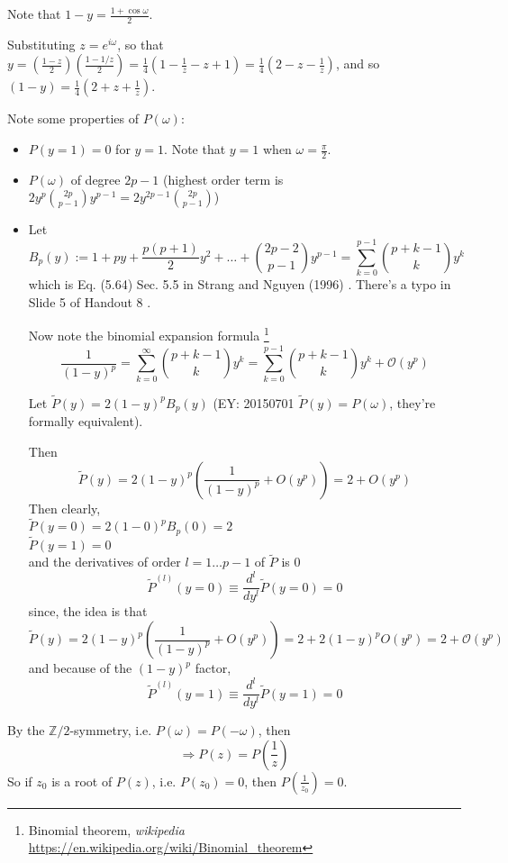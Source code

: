\documentclass[twoside]{amsart}
\theoremstyle{plain}
\theoremstyle{definition}
\theoremstyle{remark}
\numberwithin{equation}{section}
\begin{document}
Note that $1-y = \frac{1 + \cos{\omega} }{2}$.

Substituting $z = e^{i \omega}$, so that $y = \left( \frac{1-z}{2} \right) \left( \frac{1 - 1/z}{2} \right) = \frac{1}{4} ( 1 - \frac{1}{z} - z + 1 ) = \frac{1}{4} (2-z-\frac{1}{z})$, and so $(1-y) = \frac{1}{4} (2 + z+\frac{1}{z})$.  

Note some properties of $P(\omega)$:

\begin{itemize}
\item $P(y=1)=0$ for $y=1$.  Note that $y=1$ when $\omega = \frac{\pi}{2}$.  
\item $P(\omega)$ of degree $2p-1$ (highest order term is $2y^p \binom{2p}{p-1} y^{p-1} = 2y^{2p-1} \binom{2p}{p-1}$)
\item Let 
\begin{equation}\label{Eq:B_p(y)}
B_p(y) := 1 + py + \frac{ p (p+1)}{2} y^2 + \dots + \binom{ 2p-2}{p-1} y^{p-1} = \sum_{k=0}^{p-1} \binom{ p+k-1}{k} y^k
\end{equation}
which is Eq. (5.64) Sec. 5.5 in Strang and Nguyen (1996) \cite{GStrangTNguyen1996}.  There's a typo in Slide 5 of Handout 8 \cite{GStrangKAmaratunga2003}.  

Now note the binomial expansion formula \footnote{Binomial theorem, \emph{wikipedia} \url{https://en.wikipedia.org/wiki/Binomial_theorem}}
\[
\frac{1}{(1-y)^p} = \sum_{k=0}^{\infty} \binom{ p + k -1 }{k} y^k = \sum_{k=0}^{p-1} \binom{p+k-1}{k} y^k + \mathcal{O}(y^p)
\]

Let $\widetilde{P}(y) = 2(1-y)^p B_p(y)$ (EY: 20150701 $\widetilde{P}(y) = P(\omega)$, they're formally equivalent).  

Then 
\[
\widetilde{P}(y) = 2(1-y)^p \left( \frac{1}{ (1-y)^p } + O(y^p)  \right) = 2 + O(y^p)
\]
Then clearly, \\
$\widetilde{P}(y=0) = 2(1-0)^p B_p(0) = 2$ \\
$\widetilde{P}(y=1)=0$  \\
and the derivatives of order $l=1\dots p-1$ of $\widetilde{P}$ is $0$
\[
\widetilde{P}^{(l)}(y=0) \equiv \frac{d^l}{dy^l} \widetilde{P}(y=0) = 0 
\]
since, the idea is that 
\[
\widetilde{P}(y) = 2(1-y)^p \left( \frac{1}{(1-y)^p} + O(y^p)\right) = 2 + 2(1-y)^p O(y^p) = 2 + \mathcal{O}(y^p)
\]
and because of the $(1-y)^p$ factor, 
\[
\widetilde{P}^{(l)}(y=1) \equiv \frac{d^l}{dy^l}\widetilde{P}(y=1) = 0
\]
\end{itemize}


By the $\mathbb{Z}/2$-symmetry, i.e. $P(\omega) = P(-\omega)$, then
\[
\Longrightarrow P(z) = P\left( \frac{1}{z} \right)
\]
So if $z_0$ is a root of $P(z)$, i.e. $P(z_0) =0$, then $P\left( \frac{1}{z_0} \right) =0$.  
\end{document}
